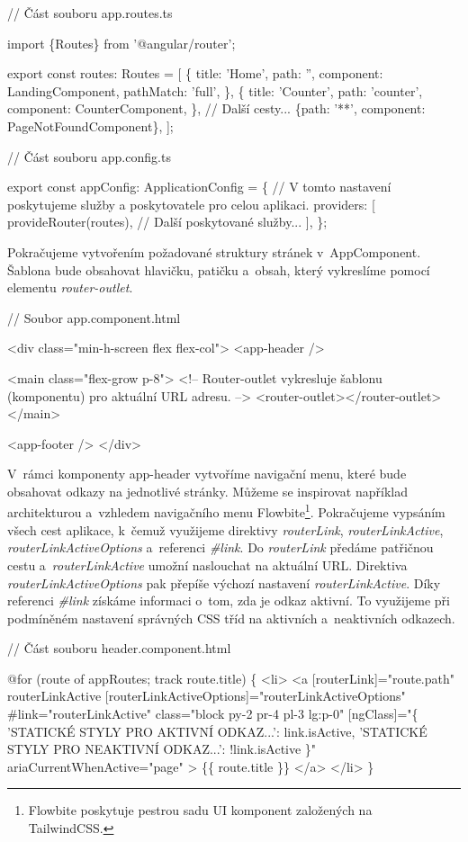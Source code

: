 \begin{prog}
// Část souboru app.routes.ts

import \{Routes\} from '@angular/router';

export const routes: Routes = [
  \{
    title: 'Home',
    path: '',
    component: LandingComponent,
    pathMatch: 'full',
  \},
  \{
    title: 'Counter',
    path: 'counter',
    component: CounterComponent,
  \},
  // Další cesty...
  \{path: '**', component: PageNotFoundComponent\},
];

// Část souboru app.config.ts

export const appConfig: ApplicationConfig = \{
  // V tomto nastavení poskytujeme služby a poskytovatele pro celou aplikaci.
  providers: [
    provideRouter(routes),
    // Další poskytované služby...
  ],
\};
\end{prog}

Pokračujeme vytvořením požadované struktury stránek v~AppComponent. Šablona bude obsahovat hlavičku, patičku a~obsah, který vykreslíme pomocí elementu \emph{router-outlet}. 

\begin{prog}
// Soubor app.component.html

<div class="min-h-screen flex flex-col">
  <app-header />

  <main class="flex-grow p-8">
    <!-- Router-outlet vykresluje šablonu (komponentu) pro aktuální URL adresu. -->
    <router-outlet></router-outlet>
  </main>

  <app-footer />
</div>
\end{prog}

V~rámci komponenty app-header vytvoříme navigační menu, které bude obsahovat odkazy na jednotlivé stránky. 
Můžeme se inspirovat například architekturou a~vzhledem navigačního menu Flowbite\footnote{Flowbite poskytuje pestrou sadu UI komponent založených na TailwindCSS.\cite{flowbitetwheader}}. 
Pokračujeme vypsáním všech cest aplikace, k~čemuž využijeme direktivy \emph{routerLink}, \emph{routerLinkActive}, \emph{routerLinkActiveOptions} a~referenci \emph{\#link}. 
Do \emph{routerLink} předáme patřičnou cestu a~\emph{routerLinkActive} umožní naslouchat na aktuální URL. Direktiva \emph{routerLinkActiveOptions} pak přepíše výchozí nastavení \emph{routerLinkActive}.
Díky referenci \emph{\#link} získáme informaci o~tom, zda je odkaz aktivní. To využijeme při podmíněném nastavení správných CSS tříd na aktivních a~neaktivních odkazech.

\begin{prog}
// Část souboru header.component.html

@for (route of appRoutes; track route.title) \{
  <li>
    <a
      [routerLink]="route.path"
      routerLinkActive
      [routerLinkActiveOptions]="routerLinkActiveOptions"
      #link="routerLinkActive"
      class="block py-2 pr-4 pl-3 lg:p-0"
      [ngClass]="\{
        'STATICKÉ STYLY PRO AKTIVNÍ ODKAZ...': link.isActive,
        'STATICKÉ STYLY PRO NEAKTIVNÍ ODKAZ...': !link.isActive
      \}"
      ariaCurrentWhenActive="page"
    >
      \{\{ route.title \}\}
    </a>
  </li>
\}
\end{prog}

